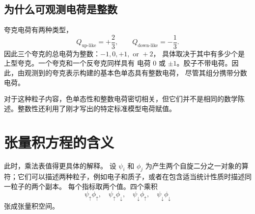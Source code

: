 \subsection{为什么可观测电荷是整数}

夸克电荷有两种类型，
\begin{equation}
Q_{\mathrm{up\text{-}like}}=+\frac23,
\qquad
Q_{\mathrm{down\text{-}like}}=-\frac13.
\end{equation}
因此三个夸克的总电荷为整数：\(-1,0,+1,\text{ or }+2\)，
具体取决于其中有多少个是上型夸克。一个夸克和一个反夸克同样具有
电荷 \(0\) 或 \(\pm1\)。胶子不带电荷。因此，由观测到的夸克表示构建的基本色单态具有整数电荷，
尽管其组分携带分数电荷。

\begin{classroomqa}
\end{classroomqa}

对于这种粒子内容，色单态性和整数电荷密切相关，但它们并不是相同的数学陈述。整数性还利用了刚才写出的特定标准模型电荷赋值。

\begin{classroomqa}
\end{classroomqa}

\section{张量积方程的含义}

此时，乘法表值得更具体的解释。
设 \(\psi_i\) 和 \(\phi_j\) 为产生两个自旋二分之一对象的算符；它们可以描述两种粒子，例如电子和质子，或者在包含适当统计性质时描述同一粒子的两个副本。
每个指标取两个值。四个乘积
\begin{equation}
\psi_\uparrow\phi_\uparrow,
\quad
\psi_\uparrow\phi_\downarrow,
\quad
\psi_\downarrow\phi_\uparrow,
\quad
\psi_\downarrow\phi_\downarrow
\end{equation}
张成张量积空间。


